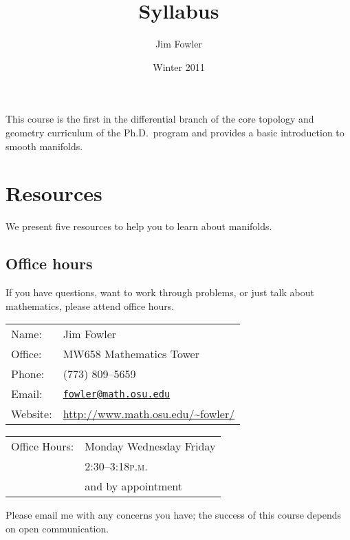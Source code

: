 \documentclass[12pt]{handout}
\title{Syllabus}
\author{Jim Fowler}
\date{Winter 2011}
\newcommand{\peem}{\textsc{p.m.}}
\begin{document}
\maketitle

\noindent This course is the first in the differential branch of the
core topology and geometry curriculum of the Ph.D.~program and
provides a basic introduction to smooth manifolds.


\section*{Resources}

\noindent%
We present five resources to help you to learn about manifolds.

\subsection*{Office hours}
If you have questions, want to work through problems, or just talk
about mathematics, please attend office hours.

\vspace{1ex}%
\noindent\parbox{0.5\textwidth}{%
\noindent\begin{tabular}{@{}ll}
\textsf{Name:} & Jim Fowler \\
\textsf{Office:} & MW658 Mathematics Tower \\
\textsf{Phone:} & (773) 809--5659 \\
\textsf{Email:} & \href{mailto:fowler@math.osu.edu}{\texttt{fowler@math.osu.edu}} \\
\textsf{Website:} & \url{http://www.math.osu.edu/~fowler/}
\end{tabular}}
\noindent\parbox{0.5\textwidth}{%
\begin{tabular}{@{}ll}
\textsf{Office Hours:}
& Monday Wednesday Friday \\
& 2:30--3:18\peem \\
& and by appointment
\end{tabular}}

\vspace{1ex}\noindent
Please email me with any concerns you have; the success of this course
depends on open communication.
\end{document}

